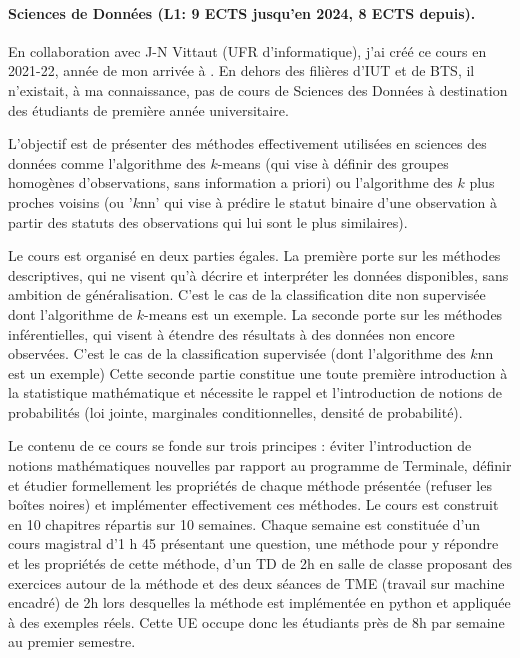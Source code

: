 
\paragraph{Sciences de Données (L1: 9 ECTS jusqu'en 2024, 8 ECTS depuis).}
En collaboration avec J-N Vittaut (UFR d'informatique), j'ai créé ce cours en 2021-22, année de mon arrivée à \SU. En dehors des filières d'IUT et de BTS, il n'existait, à ma connaissance, pas de cours de Sciences des Données à destination des étudiants de première année universitaire. 

L'objectif est de présenter des méthodes effectivement utilisées en sciences des données comme l'algorithme des $k$-means (qui vise à définir des groupes homogènes d'observations, sans information a priori) ou l'algorithme des $k$ plus proches voisins (ou '$k$nn' qui vise à prédire le statut binaire d'une observation à partir des statuts des observations qui lui sont le plus similaires). 

Le cours est organisé en deux parties égales. La première porte sur les méthodes descriptives, qui ne visent qu’à décrire et interpréter les données disponibles, sans ambition de généralisation. C’est le cas de la classification dite non supervisée dont l’algorithme de $k$-means est un exemple. La seconde porte sur les méthodes inférentielles, qui visent à étendre des résultats à des données non encore observées. C’est le cas de la classification supervisée (dont l’algorithme des $k$nn est un exemple) Cette seconde partie constitue une toute première introduction à la statistique mathématique et nécessite le rappel et l'introduction de notions de probabilités (loi jointe, marginales conditionnelles, densité de probabilité).

Le contenu de ce cours se fonde sur trois principes : éviter l'introduction de notions mathématiques nouvelles par rapport au programme de Terminale, définir et étudier formellement les propriétés de chaque méthode présentée (refuser les boîtes noires) et implémenter effectivement ces méthodes. Le cours est construit en 10 chapitres répartis sur 10 semaines. Chaque semaine est constituée d'un cours magistral d'1 h 45 présentant une question, une méthode pour y répondre et les propriétés de cette méthode, d'un TD de 2h en salle de classe proposant des exercices autour de la méthode et des deux séances de TME (travail sur machine encadré) de 2h lors desquelles la méthode est implémentée en python et appliquée à des exemples réels. Cette UE occupe donc les étudiants près de 8h par semaine au premier semestre.

